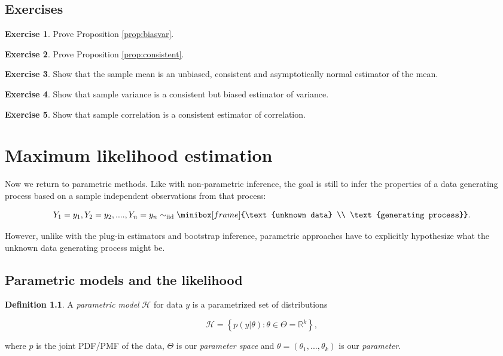 \documentclass{book}
\theoremstyle{plain}%
\theoremstyle{definition}
\newtheorem{definition}{Definition}[section]
\newtheorem{exercise}{Exercise}[chapter]
\begin{document}
\section*{Exercises}

\begin{exercise}
Prove Proposition \ref{prop:biasvar}.
\end{exercise}

\begin{exercise}
Prove Proposition \ref{prop:consistent}.
\end{exercise}

\begin{exercise}
Show that the sample mean is an unbiased, consistent and asymptotically normal estimator of the mean.
\end{exercise}

\begin{exercise}
Show that sample variance is a consistent but biased estimator of variance.
\end{exercise}

\begin{exercise}
Show that sample correlation is a consistent estimator of correlation.
\end{exercise}



\chapter{Maximum likelihood estimation}\label{ch:ml}

Now we return to parametric methods. Like with non-parametric inference, the goal is still to infer the properties of a data generating process based on a sample independent observations from that process:

$$Y_1 = y_1, Y_2 = y_2, ...., Y_n = y_n \sim_\text{iid} \minibox[frame]{\text{unknown data} \\ \text{generating process}}.$$

However, unlike with the plug-in estimators and bootstrap inference, parametric approaches have to explicitly hypothesize what the unknown data generating process might be.


\section{Parametric models and the likelihood}

\begin{definition} A \emph{parametric model} $\mathcal{H}$ for data $y$ is a parametrized set of distributions

$$\mathcal{H} = \left\lbrace p(y|\theta) : \theta \in \Theta = \mathbb{R}^k \right\rbrace,$$

where $p$ is the joint PDF/PMF of the data, $\Theta$ is our \textit{parameter space} and $\theta = (\theta_1,...,\theta_k)$ is our \textit{parameter}.

\end{definition}
\end{document}
